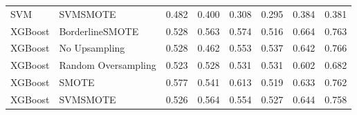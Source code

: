 \begin{tabular}{llllllll}
                            SVM &                      SVMSMOTE & 0.482 &                     0.400 &                 0.308 &                  0.295 &                                   0.384 &     0.381 \\
                        XGBoost &               BorderlineSMOTE & 0.528 &                     0.563 &                 0.574 &                  0.516 &                                   0.664 &     0.763 \\
                        XGBoost &                 No Upsampling & 0.528 &                     0.462 &                 0.553 &                  0.537 &                                   0.642 &     0.766 \\
                        XGBoost &           Random Oversampling & 0.523 &                     0.528 &                 0.531 &                  0.531 &                                   0.602 &     0.682 \\
                        XGBoost &                         SMOTE & 0.577 &                     0.541 &                 0.613 &                  0.519 &                                   0.633 &     0.762 \\
                        XGBoost &                      SVMSMOTE & 0.526 &                     0.564 &                 0.554 &                  0.527 &                                   0.644 &     0.758 \\
\bottomrule
\end{tabular}
